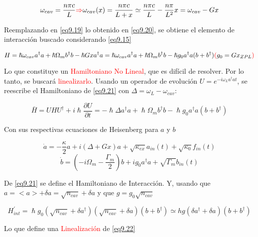 \documentclass{book}
\begin{document}
\begin{equation}\label{eq9.20}\omega_{cav}=\frac{n\pi c}{L}\textcolor{red}{\Rightarrow}\omega_{cav}(x)=\frac{n\pi c}{L+x}\simeq \frac{n\pi c}{L}-\frac{n\pi}{L^2}x =\omega_{cav}-Gx\end{equation}

Reemplazando en \ref{eq9.19} lo obtenido en \ref{eq9.20}, se obtiene el elemento de interacción buscado considerando \ref{eq9.15}

\begin{equation}\label{eq9.21}H=\hslash\omega_{cav}a^\dag a +\hslash \Omega_m b^\dag b-\hslash G x a^\dag a = \hslash\omega_{cav}a^\dag a +\hslash \Omega_m b^\dag b -\hslash g_0 a^\dag a(b+b^\dag) \textcolor{red}{(}g_0=G x_{ZPL}\textcolor{red}{)}\end{equation}

Lo que constituye un \textcolor{red}{Hamiltoniano No Lineal}, que es difícil de resolver. Por lo tanto, se buscará \textcolor{red}{linealizarlo}. Usando un operador de evolución $U=e^{-i\omega_L a^\dag a t}$, se reescribe el Hamiltoniano de \ref{eq9.21} con $\Delta=\omega_L-\omega_{cav}$:

\begin{equation}\label{eq9.22}\bar{H}=UHU^\dag+i\hslash\frac{\partial U}{\partial t}=-\hslash\Delta a^\dag a +\hslash \Omega_m b^\dag b -\hslash g_0 a^\dag a(b+b^\dag) \end{equation}

Con sus respectivas ecuaciones de Heisenberg para $a$ y $b$

\begin{equation}\label{eq9.23}\dot{a}=-\frac{\kappa}{2}a+i(\Delta+Gx)a+\sqrt{\kappa_{ex}}a_{in}(t)+\sqrt{\kappa_0}f_{in}(t)\end{equation}
\begin{equation}\label{eq9.24}\dot{b}=(-i\Omega_m-\frac{\Gamma_m}{2})b+ig_0a^\dag a+\sqrt{\Gamma_m}b_{in}(t)\end{equation}

De \ref{eq9.21} se define el Hamiltoniano de Interacción. Y, usando que $a=<a>+\delta a=\sqrt{n_{cav}}+\delta a$ y que $g=g_0\sqrt{n_{cav}}$

\begin{equation}\label{eq9.25}H^\prime_{int}=\hslash g_0(\sqrt{n_{cav}}+\delta a^\dag)(\sqrt{n_{cav}}+\delta a)(b+b^\dag)\simeq h g (\delta a^\dag+\delta a)(b+b^\dag)\end{equation}

Lo que define una \textcolor{red}{Linealización} de \ref{eq9.22}
\end{document}
